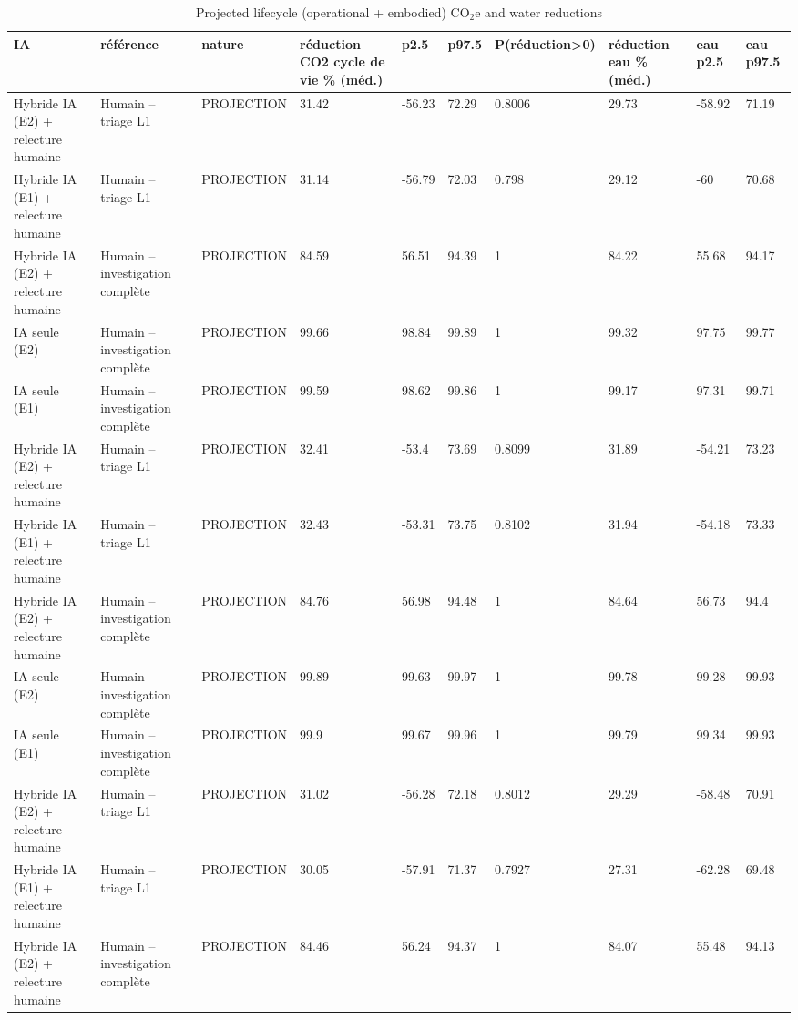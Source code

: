 \begin{table}[!t]
\centering
\caption{Projected lifecycle (operational + embodied) CO$_2$e and water reductions}
\label{tab:lifecycle}
\begin{tabular}{llllllllll}
\hline
IA & référence & nature & réduction CO2 cycle de vie \% (méd.) & p2.5 & p97.5 & P(réduction>0) & réduction eau \% (méd.) & eau p2.5 & eau p97.5 \\
\hline
Hybride IA (E2) + relecture humaine & Humain – triage L1 & PROJECTION & 31.42 & -56.23 & 72.29 & 0.8006 & 29.73 & -58.92 & 71.19 \\
Hybride IA (E1) + relecture humaine & Humain – triage L1 & PROJECTION & 31.14 & -56.79 & 72.03 & 0.798 & 29.12 & -60 & 70.68 \\
Hybride IA (E2) + relecture humaine & Humain – investigation complète & PROJECTION & 84.59 & 56.51 & 94.39 & 1 & 84.22 & 55.68 & 94.17 \\
IA seule (E2) & Humain – investigation complète & PROJECTION & 99.66 & 98.84 & 99.89 & 1 & 99.32 & 97.75 & 99.77 \\
IA seule (E1) & Humain – investigation complète & PROJECTION & 99.59 & 98.62 & 99.86 & 1 & 99.17 & 97.31 & 99.71 \\
Hybride IA (E2) + relecture humaine & Humain – triage L1 & PROJECTION & 32.41 & -53.4 & 73.69 & 0.8099 & 31.89 & -54.21 & 73.23 \\
Hybride IA (E1) + relecture humaine & Humain – triage L1 & PROJECTION & 32.43 & -53.31 & 73.75 & 0.8102 & 31.94 & -54.18 & 73.33 \\
Hybride IA (E2) + relecture humaine & Humain – investigation complète & PROJECTION & 84.76 & 56.98 & 94.48 & 1 & 84.64 & 56.73 & 94.4 \\
IA seule (E2) & Humain – investigation complète & PROJECTION & 99.89 & 99.63 & 99.97 & 1 & 99.78 & 99.28 & 99.93 \\
IA seule (E1) & Humain – investigation complète & PROJECTION & 99.9 & 99.67 & 99.96 & 1 & 99.79 & 99.34 & 99.93 \\
Hybride IA (E2) + relecture humaine & Humain – triage L1 & PROJECTION & 31.02 & -56.28 & 72.18 & 0.8012 & 29.29 & -58.48 & 70.91 \\
Hybride IA (E1) + relecture humaine & Humain – triage L1 & PROJECTION & 30.05 & -57.91 & 71.37 & 0.7927 & 27.31 & -62.28 & 69.48 \\
Hybride IA (E2) + relecture humaine & Humain – investigation complète & PROJECTION & 84.46 & 56.24 & 94.37 & 1 & 84.07 & 55.48 & 94.13 \\

\end{tabular}
\end{table}
